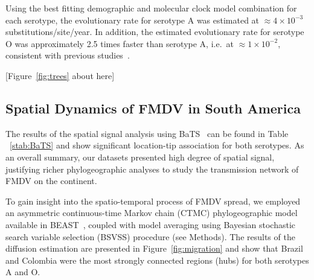 \documentclass[10pt]{article}
\begin{document}
Using the best fitting demographic and molecular clock model combination for each serotype, the evolutionary rate for serotype A was estimated at  $\approx 4 \times 10^{-3}$ substitutions/site/year.
In addition, the estimated evolutionary rate for serotype O was approximately 2.5 times faster than serotype A, i.e.~at $\approx 1 \times 10^{-2}$, consistent with previous studies~\cite{tully,Carvalho2013,Muellner2011}. 
\begin{center}
 [Figure~\ref{fig:trees} about here]
\end{center}

\subsection*{Spatial Dynamics of FMDV in South America}

The results of the spatial signal analysis using BaTS~\cite{bats} can be found in Table ~\ref{stab:BaTS} and show significant location-tip association for both serotypes.
As an overall summary, our datasets presented high degree of spatial signal, justifying richer phylogeographic analyses to study the transmission network of FMDV on the continent.

To gain insight into the spatio-temporal process of FMDV spread, we employed an asymmetric continuous-time Markov chain (CTMC) phylogeographic model~\cite{roots} available in BEAST~\cite{beast2012}, coupled with model averaging using Bayesian stochastic search variable selection (BSVSS) procedure (see Methods).
The results of the diffusion estimation are presented in Figure~\ref{fig:migration} and show that Brazil and Colombia were the most strongly connected regions (hubs) for both serotypes A and O.
\end{document}
